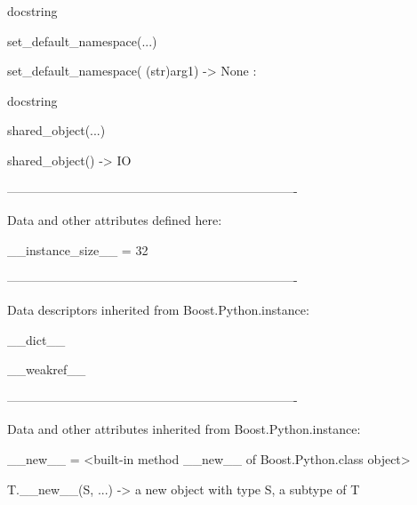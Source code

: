 \documentclass[letterpaper,10pt,english]{sphinxmanual}
\begin{document}
\begin{description}
\begin{description}
\begin{DUlineblock}{0em}
\begin{DUlineblock}{\DUlineblockindent}
\begin{DUlineblock}{\DUlineblockindent}
\item[] docstring
\item[] 
\end{DUlineblock}
\end{DUlineblock}
\item[] set\_default\_namespace(...)
\item[]
\begin{DUlineblock}{\DUlineblockindent}
\item[] set\_default\_namespace( (str)arg1) -\textgreater{} None :
\item[]
\begin{DUlineblock}{\DUlineblockindent}
\item[] docstring
\item[] 
\end{DUlineblock}
\end{DUlineblock}
\item[] shared\_object(...)
\item[]
\begin{DUlineblock}{\DUlineblockindent}
\item[] shared\_object() -\textgreater{} IO
\item[] 
\end{DUlineblock}
\item[] ----------------------------------------------------------------------
\item[] Data and other attributes defined here:
\item[] 
\item[] \_\_instance\_size\_\_ = 32
\item[] 
\item[] ----------------------------------------------------------------------
\item[] Data descriptors inherited from Boost.Python.instance:
\item[] 
\item[] \_\_dict\_\_
\item[] 
\item[] \_\_weakref\_\_
\item[] 
\item[] ----------------------------------------------------------------------
\item[] Data and other attributes inherited from Boost.Python.instance:
\item[] 
\item[] \_\_new\_\_ = \textless{}built-in method \_\_new\_\_ of Boost.Python.class object\textgreater{}
\item[]
\begin{DUlineblock}{\DUlineblockindent}
\item[] T.\_\_new\_\_(S, ...) -\textgreater{} a new object with type S, a subtype of T
\end{DUlineblock}
\end{DUlineblock}


\end{description}
\end{description}
\end{document}
